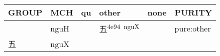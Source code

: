 \documentclass[14pt,a4paper]{scrartcl}
\begin{document}
\begin{longtable}[c]{@{}llllll@{}}
\toprule
\begin{minipage}[b]{0.14\columnwidth}\raggedright\strut
GROUP
\strut\end{minipage} &
\begin{minipage}[b]{0.14\columnwidth}\raggedright\strut
MCH
\strut\end{minipage} &
\begin{minipage}[b]{0.14\columnwidth}\raggedright\strut
qu
\strut\end{minipage} &
\begin{minipage}[b]{0.14\columnwidth}\raggedright\strut
other
\strut\end{minipage} &
\begin{minipage}[b]{0.14\columnwidth}\raggedright\strut
none
\strut\end{minipage} &
\begin{minipage}[b]{0.14\columnwidth}\raggedright\strut
PURITY
\strut\end{minipage}\tabularnewline
\midrule
\endhead
\begin{minipage}[t]{0.14\columnwidth}\raggedright\strut
𠄡
\strut\end{minipage} &
\begin{minipage}[t]{0.14\columnwidth}\raggedright\strut
nguH
\strut\end{minipage} &
\begin{minipage}[t]{0.14\columnwidth}\raggedright\strut
\strut\end{minipage} &
\begin{minipage}[t]{0.14\columnwidth}\raggedright\strut
五\textsuperscript{4e94~nguX}
\strut\end{minipage} &
\begin{minipage}[t]{0.14\columnwidth}\raggedright\strut
\strut\end{minipage} &
\begin{minipage}[t]{0.14\columnwidth}\raggedright\strut
pure:other
\strut\end{minipage}\tabularnewline
\begin{minipage}[t]{0.14\columnwidth}\raggedright\strut
五
\strut\end{minipage} &
\begin{minipage}[t]{0.14\columnwidth}\raggedright\strut
nguX
\strut\end{minipage} &
\begin{minipage}[t]{0.14\columnwidth}\raggedright\strut
\strut\end{minipage} &

\end{longtable}
\end{document}
